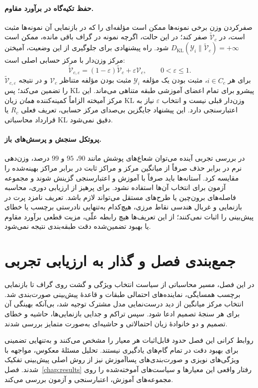 \paragraph{حفظ تکیه‌گاه در برآورد مقاوم.}
صفرکردن وزن برخی نمونه‌ها ممکن است مؤلفه‌ای
را که در بازنمایی آن نمونه‌ها مثبت است،
در $\widetilde{\mathcal V}_c$ صفر کند؛
در این حالت، اگرچه نمونه در گراف باقی مانده،
ممکن است
$D_{\mathrm{KL}}(\mathscr Y_i\|
\widetilde{\mathcal V}_c)=+\infty$
شود. راه پیشنهادی برای جلوگیری از این وضعیت،
آمیختن مرکز وزن‌دار با مرکز حسابی اصلی است:
\begin{equation}\label{cmp:eq:ch3-outlier-support-preserving-center}
\widetilde{\mathcal V}_{c,\varepsilon}
=(1-\varepsilon)\widetilde{\mathcal V}_c
+\varepsilon\mathcal V_c,\qquad
0<\varepsilon\le1.
\end{equation}
برای هر $i\in C_c$، مثبت بودن یک مؤلفه
$\mathscr Y_i$ مثبت بودن مؤلفه متناظر
$\mathcal V_c$ و در نتیجه
$\widetilde{\mathcal V}_{c,\varepsilon}$
را تضمین می‌کند؛ پس KL پیشرو
برای تمام اعضای آموزشی طبقه متناهی می‌ماند.
این مرکز آمیخته الزاماً کمینه‌کننده
\emph{همان} زیان KL وزن‌دار قبلی نیست
و انتخاب $\varepsilon$ نیاز به اعتبارسنجی دارد.
این پیشنهاد جایگزین بی‌صدای
مرکز حسابی، تعریف فعلی $R_c$ یا قرارداد
محاسباتی KL دقیق نمی‌شود.

\paragraph{پروتکل سنجش و پرسش‌های باز.}
در بررسی تجربی آینده می‌توان
شعاع‌های پوشش مانند $90$، $95$ و $99$ درصد،
وزن‌دهی نرم در برابر حذف صرفاً از میانگین مرکز
و مراکز ثابت در برابر مراکز بهینه‌شده را مقایسه کرد.
آستانه‌ها باید صرفاً با آموزش و اعتبارسنجی
گزینش شوند و مجموعه آزمون برای انتخاب آن‌ها
استفاده نشود. برای پرهیز از ارزیابی دوری،
محاسبه فاصله‌های برون‌چین یا طرح‌های مستقل
می‌تواند لازم باشد.
تعریف نامزد پرت در بازنمایی و غربال
هندسی نقاط مرزی، هیچ‌کدام به‌تنهایی
نادرستی برچسب یا خطای پیش‌بینی
را اثبات نمی‌کنند؛ از این تعریف‌ها
هیچ رابطه علّی، مزیت قطعی برآورد
مقاوم یا بهبود تضمین‌شده دقت
طبقه‌بندی نتیجه نمی‌شود.

\section{جمع‌بندی فصل و گذار به ارزیابی تجربی}
در این فصل، مسیر محاسباتی از سیاست انتخاب ویژگی
و گشت روی گراف تا بازنمایی برچسب همسایگی،
نماینده‌های احتمالی طبقات و قاعدهٔ پیش‌بینی
صورت‌بندی شد. انتخاب مرکز میانگین از دید
درست‌نمایی مدل مشترک توجیه شد، بی‌آنکه
بهینگی آن برای هر سنجهٔ تصمیم ادعا شود.
سپس تراکم و جدایی بازنمایی‌ها، حاشیه و خطای
تصمیم و دو خانوادهٔ زیان احتمالاتی و حاشیه‌ای
به‌صورت متمایز بررسی شدند.

روابط کرانی این فصل حدود قابل‌اثبات هر معیار
را مشخص می‌کنند و به‌تنهایی تضمینی برای
بهبود دقت در تمام گام‌های یادگیری نیستند.
تحلیل مسئلهٔ معکوس، مواجهه با ویژگی‌های نویزی
و صورت‌بندی‌های پساآموزش نیز از روش اصلی
پیش‌بینی تفکیک شدند.
فصل~\ref{chap:results} رفتار واقعی این معیارها
و سیاست‌های آموخته‌شده را روی مجموعه‌های
آموزش، اعتبارسنجی و آزمون بررسی می‌کند.

\endgroup

